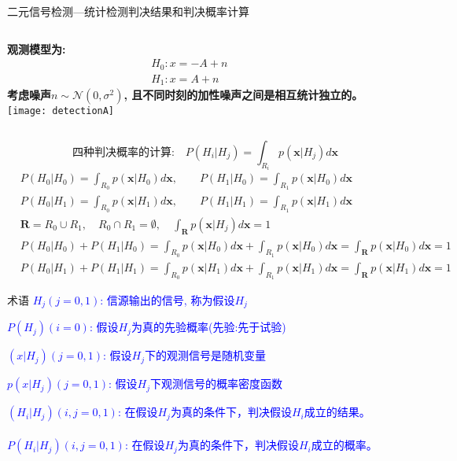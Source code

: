 \begin{frame}[shrink]{二元信号检测---统计检测判决结果和判决概率计算}
\begin{columns}
	\textbf{观测模型为:}
	\begin{align*}
	&H_0: x=-A+n\\
	&H_1: x=A+n
	\end{align*}
	\textbf{考虑噪声$n\sim\mathcal{N}(0,\sigma^2)$, 且不同时刻的加性噪声之间是相互统计独立的。}\\
	\texttt{[image: detectionA]}
\end{columns}
\[\text{四种判决概率的计算:}\quad P(H_i|H_j)=\int_{R_i}p(\bm{x}|H_j)d\bm{x} \]
\begin{align*}
&P(H_0|H_0)=\int_{R_0}p(\bm{x}|H_0)d\bm{x},\qquad P(H_1|H_0)=\int_{R_1}p(\bm{x}|H_0)d\bm{x}\\
&P(H_0|H_1)=\int_{R_0}p(\bm{x}|H_1)d\bm{x},\qquad P(H_1|H_1)=\int_{R_1}p(\bm{x}|H_1)d\bm{x}\\
&\bm{R}=R_0\cup R_1,\quad R_0\cap R_1=\emptyset, \quad \int_{\bm{R}}p(\bm{x}|H_j)d\bm{x}=1\\
&P(H_0|H_0)+P(H_1|H_0)=\int_{R_0}p(\bm{x}|H_0)d\bm{x}+\int_{R_1}p(\bm{x}|H_0)d\bm{x}=\int_{\bm{R}}p(\bm{x}|H_0)d\bm{x}=1\\
&P(H_0|H_1)+P(H_1|H_1)=\int_{R_0}p(\bm{x}|H_1)d\bm{x}+\int_{R_1}p(\bm{x}|H_1)d\bm{x}=\int_{\bm{R}}p(\bm{x}|H_1)d\bm{x}=1
\end{align*}
\end{frame}

\begin{frame}{术语}
\textcolor{blue}{$H_j(j=0,1)$: 信源输出的信号, 称为假设$H_j$}

\bigskip

\textcolor{blue}{$P(H_j)(i=0)$: 假设$H_j$为真的先验概率(先验:先于试验)}


\bigskip
\textcolor{blue}{$(x|H_j)(j=0,1)$: 假设$H_j$下的观测信号是随机变量}

\bigskip

\textcolor{blue}{$p(x|H_j)(j=0,1)$: 假设$H_j$下观测信号的概率密度函数}

\bigskip

\textcolor{blue}{$(H_i|H_j)(i,j=0,1)$: 在假设$H_j$为真的条件下，判决假设$H_i$成立的结果。}\\
~\\
\textcolor{blue}{$P(H_i|H_j)(i,j=0,1)$: 在假设$H_j$为真的条件下，判决假设$H_i$成立的概率。}\\
\end{frame}

